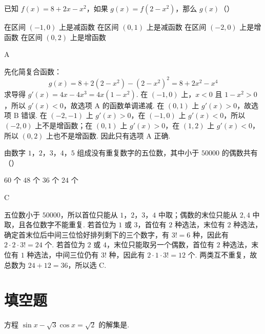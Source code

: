 \documentclass[UTF8,a4paper,oneside,11pt]{ctexbook}
\begin{document}
\begin{problem}
已知 \(f(x) = 8 + 2x - x^2\)，如果 \(g(x) = f(2 - x^2)\)，那么 \(g(x)\)（\quad）

\choices
    {在区间 \((-1,0)\) 上是减函数}
    {在区间 \((0,1)\) 上是减函数}
    {在区间 \((-2,0)\) 上是增函数}
    {在区间 \((0,2)\) 上是增函数}
\end{problem}

\begin{answer}
A
\end{answer}

\begin{solution}
先化简复合函数：
\[
g(x)=8+2(2-x^2)-(2-x^2)^2=8+2x^2-x^4
\]
求导得 \(g'(x)=4x-4x^3=4x(1-x^2)\). 在 \((-1,0)\) 上，\(x<0\) 且 \(1-x^2>0\)，所以 \(g'(x)<0\)，故选项 A 的函数单调递减. 在 \((0,1)\) 上 \(g'(x)>0\)，故选项 B 错误. 在 \((-2,-1)\) 上 \(g'(x)>0\)，在 \((-1,0)\) 上 \(g'(x)<0\)，所以 \((-2,0)\) 上不是增函数；在 \((0,1)\) 上 \(g'(x)>0\)，在 \((1,2)\) 上 \(g'(x)<0\)，所以 \((0,2)\) 上也不是增函数. 因此只有选项 A 正确.
\end{solution}

\begin{problem}
由数字 \(1\)，\(2\)，\(3\)，\(4\)，\(5\) 组成没有重复数字的五位数，其中小于 \(50000\) 的偶数共有（\quad）

\choices
    {\(60\text{ 个}\)}
    {\(48\text{ 个}\)}
    {\(36\text{ 个}\)}
    {\(24\text{ 个}\)}
\end{problem}

\begin{answer}
C
\end{answer}

\begin{solution}
五位数小于 \(50000\)，所以首位只能从 \(1\)，\(2\)，\(3\)，\(4\) 中取；偶数的末位只能从 \(2,4\) 中取，且各位数字不能重复. 若首位为 \(1\) 或 \(3\)，首位有 \(2\) 种选法，末位有 \(2\) 种选法，确定首末位后中间三位恰好排列剩下的三个数字，有 \(3!=6\) 种，因此有 \(2\cdot2\cdot3!=24\) 个. 若首位为 \(2\) 或 \(4\)，末位只能取另一个偶数，首位有 \(2\) 种选法，末位有 \(1\) 种选法，中间三位仍有 \(3!\) 种，因此有 \(2\cdot1\cdot3!=12\) 个. 两类互不重复，故总数为 \(24+12=36\)，所以选 C.
\end{solution}

\section{填空题}

\begin{problem}
方程 \(\sin x - \sqrt{3}\cos x = \sqrt{2}\) 的解集是\fillinblank{}.
\end{problem}
\end{document}
